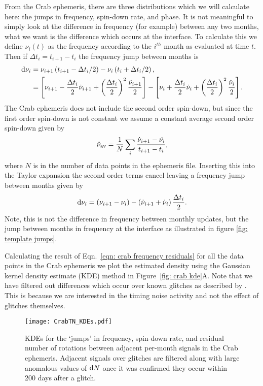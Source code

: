 \documentclass[../full_thesis/full_thesis.tex]{subfiles}
\begin{document}
{From the Crab ephemeris, there are three distributions which we will calculate
here: the jumps in frequency, spin-down rate, and phase. It is not meaningful
to simply look at the difference in frequency (for example) between any two
months, what we want is the difference which occurs at the interface. To
calculate this we define $\nu_{i}(t)$ as the frequency according to the
$i^{th}$ month as evaluated at time $t$. Then if $\Delta t_{i} = t_{i+1} -
t_{i}$ the frequency jump between months is
\begin{align}
\mathrm{d}\nu_{i} &= \nu_{i+1}\left(t_{i+1}-\Delta t_{i}/2\right) -  \nu_{i}\left(t_{i}+\Delta t_{i}/2\right), \\
    &= \left[\nu_{i+1}- \frac{\Delta t_{i}}{2}\dot{\nu}_{i+1} + \left(\frac{\Delta t_{i}}{2}\right)^{2}\frac{\ddot{\nu}_{i+1}}{2}\right]
     - \left[\nu_{i} + \frac{\Delta t_{i}}{2}\dot{\nu}_{i}+ \left(\frac{\Delta t_{i}}{2}\right)^{2}\frac{\ddot{\nu}_{i}}{2}\right] .
\end{align}
The Crab ephemeris does not include the second order spin-down, but since the
first order spin-down is not constant we assume a constant average second order
spin-down given by
\begin{equation}
   \ddot{\nu}_{\textrm{av}} = \frac{1}{N}\sum_{i} \frac{\dot{\nu}_{i+1} - \dot{\nu_{i}}}{t_{i+1} - t_{i}},
   \label{eqn: average second order spin-down}
\end{equation}
where $N$ is in the number of data points in the ephemeris file. Inserting this
into the Taylor expansion the second order terms cancel leaving a frequency
jump between months given by
\begin{equation}
\mathrm{d}\nu_{i} = \left(\nu_{i+1}- \nu_{i}\right) -  \left(\dot{\nu}_{i+1}
               + \dot{\nu}_{i}\right)\frac{\Delta t_{i}}{2}.
\label{eqn: crab frequency residuals}
\end{equation}
Note, this is not the difference in frequency between monthly
updates, but the jump between months in frequency at the interface as illustrated in figure
\ref{fig: template jumps}.

Calculating the result of Eqn.~\eqref{eqn: crab frequency residuals} for all
the data points in the Crab ephemeris we plot the estimated density using the
Gaussian kernel density estimate (KDE) method \citep{Scipy} in Figure~\ref{fig:
crab kde}A. Note that we have filtered out differences which occur over known
glitches as described by \citet{Espinoza2011}. This is because we are
interested in the timing noise activity and not the effect of glitches
themselves.
\begin{figure}[ht]
\centering
\texttt{[image: CrabTN\_KDEs.pdf]}
\caption{KDEs for the `jumps' in frequency, spin-down rate, and residual number
of rotations between adjacent per-month signals in the Crab ephemeris.
Adjacent signals over glitches are filtered along with large anomalous values
of $\mathrm{d} N$ once it was confirmed they occur within 200 days after a glitch.}
\label{fig: crab kde}
\end{figure}

}
\end{document}
